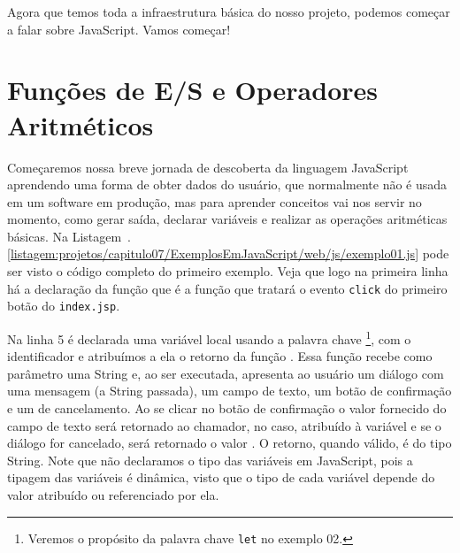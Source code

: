 
Agora que temos toda a infraestrutura básica do nosso projeto, podemos começar a falar sobre JavaScript. Vamos começar!



\section{Funções de E/S e Operadores Aritméticos}

Começaremos nossa breve jornada de descoberta da linguagem JavaScript aprendendo uma forma de obter dados do usuário, que normalmente não é usada em um software em produção, mas para aprender conceitos vai nos servir no momento, como gerar saída, declarar variáveis e realizar as operações aritméticas básicas. Na Listagem~\thechapter.\ref{listagem:projetos/capitulo07/ExemplosEmJavaScript/web/js/exemplo01.js} pode ser visto o código completo do primeiro exemplo. Veja que logo na primeira linha há a declaração da função  que é a função que tratará o evento \texttt{click} do primeiro botão do \texttt{index.jsp}.


Na linha 5 é declarada uma variável local usando a palavra chave \footnote{Veremos o propósito da palavra chave \texttt{let} no exemplo 02.}, com o identificador  e atribuímos a ela o retorno da função . Essa função recebe como parâmetro uma String e, ao ser executada, apresenta ao usuário um diálogo com uma mensagem (a String passada), um campo de texto, um botão de confirmação e um de cancelamento. Ao se clicar no botão de confirmação o valor fornecido do campo de texto será retornado ao chamador, no caso, atribuído à variável  e se o diálogo for cancelado, será retornado o valor . O retorno, quando válido, é do tipo String. Note que não declaramos o tipo das variáveis em JavaScript, pois a tipagem das variáveis é dinâmica, visto que o tipo de cada variável depende do valor atribuído ou referenciado por ela.

